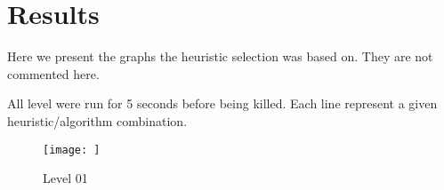 \chapter{Results}
\label{app:results}
Here we present the graphs the heuristic selection was based on. They
are not commented here.

All level were run for 5 seconds before being killed. Each line
represent a given heuristic/algorithm combination.

\begin{figure}
  \centering
  \texttt{[image: ]}
  \caption{Level 01}
  \label{fig:level01-stats}
\end{figure}